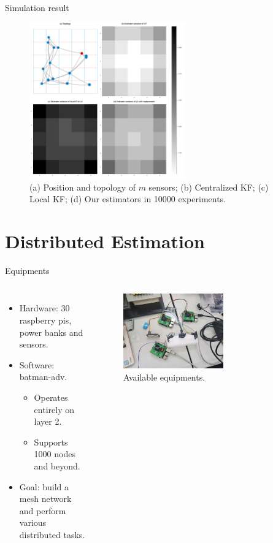 \documentclass[10pt]{beamer}
\DeclareMathOperator{\1}{\textbf{1}}
\begin{document}
\begin{frame}{Simulation result}
	\begin{figure}[]
		\centering
		\includegraphics[width=0.6\textwidth]{pic/variance.pdf}
		\caption{(a) Position and topology of $m$ sensors; (b) Centralized KF; (c) Local KF; (d) Our estimators in 10000 experiments.}
		\label{fig:heatmap}
	\end{figure}
\end{frame}

\section{Distributed Estimation}
\begin{frame}{Equipments}
	\begin{columns}[c]
		\column{6cm}
		\begin{itemize}
			\item Hardware: 30 raspberry pis, power banks and sensors.
			\item Software: batman-adv.
				\begin{itemize}
					\item Operates entirely on layer 2.
					\item Supports 1000 nodes and beyond.
				\end{itemize}
			\item Goal: build a mesh network and perform various distributed tasks.
		\end{itemize}
		\column{6cm}
		\begin{figure}
			\centering
			\includegraphics[width=0.6\textwidth,angle=90]{pic/rapberry_pi.jpg}
			\caption{Available equipments.}
		\end{figure}
	\end{columns}
\end{frame}
\end{document}
